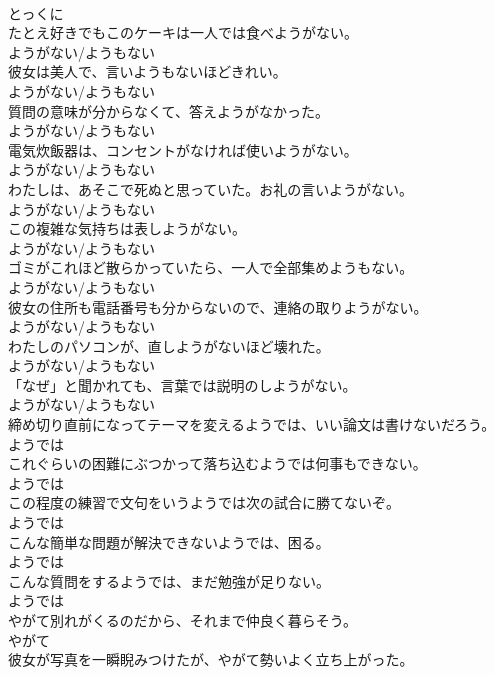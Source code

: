 \documentclass[8pt]{extreport}
\begin{document}
\begin{CJK}{UTF8}{min}
\\	とっくに	
\\	たとえ好きでもこのケーキは一人では食べようがない。	
\\	ようがない/ようもない	
\\	彼女は美人で、言いようもないほどきれい。	
\\	ようがない/ようもない	
\\	質問の意味が分からなくて、答えようがなかった。	
\\	ようがない/ようもない	
\\	電気炊飯器は、コンセントがなければ使いようがない。	
\\	ようがない/ようもない	
\\	わたしは、あそこで死ぬと思っていた。お礼の言いようがない。	
\\	ようがない/ようもない	
\\	この複雑な気持ちは表しようがない。	
\\	ようがない/ようもない	
\\	ゴミがこれほど散らかっていたら、一人で全部集めようもない。	
\\	ようがない/ようもない	
\\	彼女の住所も電話番号も分からないので、連絡の取りようがない。	
\\	ようがない/ようもない	
\\	わたしのパソコンが、直しようがないほど壊れた。	
\\	ようがない/ようもない	
\\	「なぜ」と聞かれても、言葉では説明のしようがない。	
\\	ようがない/ようもない	
\\	締め切り直前になってテーマを変えるようでは、いい論文は書けないだろう。	
\\	ようでは	
\\	これぐらいの困難にぶつかって落ち込むようでは何事もできない。	
\\	ようでは	
\\	この程度の練習で文句をいうようでは次の試合に勝てないぞ。	
\\	ようでは	
\\	こんな簡単な問題が解決できないようでは、困る。	
\\	ようでは	
\\	こんな質問をするようでは、まだ勉強が足りない。	
\\	ようでは	
\\	やがて別れがくるのだから、それまで仲良く暮らそう。	
\\	やがて	
\\	彼女が写真を一瞬睨みつけたが、やがて勢いよく立ち上がった。	

\end{CJK}
\end{document}
